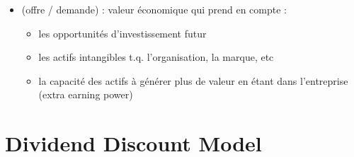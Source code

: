 \begin{itemize}
    \item {} (offre / demande) : valeur économique qui prend en compte :
    \begin{itemize}
        \item les opportunités d'investissement futur
        \item les actifs intangibles t.q. l’organisation, la marque, etc
        \item la capacité des actifs à générer plus de valeur en étant dans l'entreprise (extra earning power)
    \end{itemize}
\end{itemize}

\section{Dividend Discount Model}

